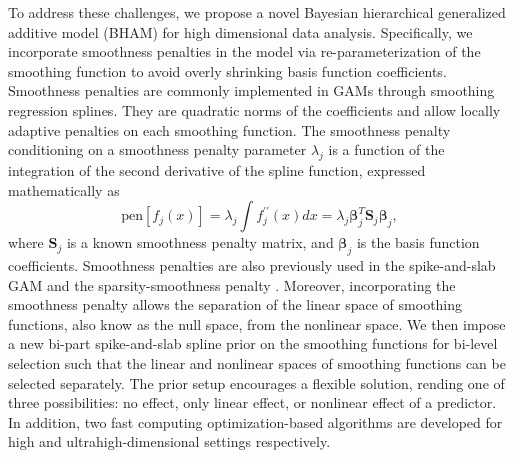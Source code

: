\documentclass[AMA,STIX1COL,]{WileyNJD-v2}
\begin{document}
To address these challenges, we propose a novel Bayesian hierarchical
generalized additive model (BHAM) for high dimensional data analysis.
Specifically, we incorporate smoothness penalties in the model via
re-parameterization of the smoothing function to avoid overly shrinking
basis function coefficients. Smoothness penalties are commonly
implemented in GAMs through smoothing regression splines. They are
quadratic norms of the coefficients and allow locally adaptive penalties
on each smoothing function. The smoothness penalty conditioning on a
smoothness penalty parameter \(\lambda_j\) is a function of the
integration of the second derivative of the spline function, expressed
mathematically as \begin{equation}\label{eq:smoothpen}
  \text{pen}\left[f_j(x)\right] = \lambda_j \int f^{\prime\prime}_j(x)dx = \lambda_j \boldsymbol{\beta}_j^T \boldsymbol{S}_j \boldsymbol{\beta}_j ,
\end{equation} where \(\boldsymbol{S}_j\) is a known smoothness penalty
matrix, and \(\boldsymbol{\beta}_j\) is the basis function coefficients.
Smoothness penalties are also previously used in the spike-and-slab GAM
\citep{Scheipl2012} and the sparsity-smoothness penalty
\citep{Meier2009}. Moreover, incorporating the smoothness penalty allows
the separation of the linear space of smoothing functions, also know as
the null space, from the nonlinear space. We then impose a new bi-part
spike-and-slab spline prior on the smoothing functions for bi-level
selection such that the linear and nonlinear spaces of smoothing
functions can be selected separately. The prior setup encourages a
flexible solution, rending one of three possibilities: no effect, only
linear effect, or nonlinear effect of a predictor. In addition, two fast
computing optimization-based algorithms are developed for high and
ultrahigh-dimensional\citep{Fan2009} settings respectively.
\end{document}
